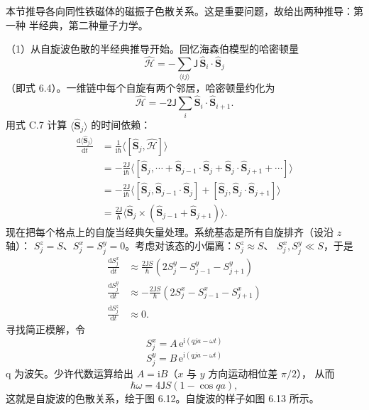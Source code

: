 本节推导各向同性铁磁体的磁振子色散关系。这是重要问题，故给出两种推导：第一种
半经典，第二种量子力学。

（1）从自旋波色散的半经典推导开始。回忆海森伯模型的哈密顿量
\begin{equation*}
\hat{\mathcal{H}} = -\sum_{\langle ij\rangle}\mathsf{J}\,\hat{\mathbf{S}}_i\cdot\hat{\mathbf{S}}_j\tag{6.9}
\end{equation*}
（即式 6.4）。一维链中每个自旋有两个邻居，哈密顿量约化为
\begin{equation*}
\hat{\mathcal{H}} = -2\mathsf{J}\sum_i\hat{\mathbf{S}}_i\cdot\hat{\mathbf{S}}_{i+1}.\tag{6.10}
\end{equation*}
用式 C.7 计算 $\langle\hat{\mathbf{S}}_j\rangle$ 的时间依赖：
\begin{align*}
\frac{\mathrm{d}\langle\hat{\mathbf{S}}_j\rangle}{\mathrm{d}t} &= \frac{1}{\mathrm{i}\hbar}\langle[\hat{\mathbf{S}}_j, \hat{\mathcal{H}}]\rangle\tag{6.11}\\
&= -\frac{2\mathsf{J}}{\mathrm{i}\hbar}\langle[\hat{\mathbf{S}}_j, \cdots+\hat{\mathbf{S}}_{j-1}\cdot\hat{\mathbf{S}}_j+\hat{\mathbf{S}}_j\cdot\hat{\mathbf{S}}_{j+1}+\cdots]\rangle\tag{6.12}\\
&= -\frac{2\mathsf{J}}{\mathrm{i}\hbar}\langle[\hat{\mathbf{S}}_j, \hat{\mathbf{S}}_{j-1}\cdot\hat{\mathbf{S}}_j]+[\hat{\mathbf{S}}_j, \hat{\mathbf{S}}_j\cdot\hat{\mathbf{S}}_{j+1}]\rangle\tag{6.13}\\
&= \frac{2\mathsf{J}}{\hbar}\langle\hat{\mathbf{S}}_j\times(\hat{\mathbf{S}}_{j-1}+\hat{\mathbf{S}}_{j+1})\rangle.\tag{6.14}
\end{align*}
现在把每个格点上的自旋当经典矢量处理。系统基态是所有自旋排齐（设沿 $z$ 轴）：
$S_j^{z}=S$、$S_j^{x}=S_j^{y}=0$。考虑对该态的小偏离：$S_j^{z}\approx S$、
$S_j^{x},S_j^{y}\ll S$，于是
\begin{align*}
\frac{\mathrm{d}S_j^{x}}{\mathrm{d}t} &\approx \frac{2\mathsf{J}S}{\hbar}(2S_j^{y}-S_{j-1}^{y}-S_{j+1}^{y})\tag{6.15}\\
\frac{\mathrm{d}S_j^{y}}{\mathrm{d}t} &\approx -\frac{2\mathsf{J}S}{\hbar}(2S_j^{x}-S_{j-1}^{x}-S_{j+1}^{x})\tag{6.16}\\
\frac{\mathrm{d}S_j^{z}}{\mathrm{d}t} &\approx 0.\tag{6.17}
\end{align*}
寻找简正模解，令
\begin{equation*}
S_j^{x} = A\,\mathrm{e}^{\mathrm{i}(qja-\omega t)}\tag{6.18}
\end{equation*}
\begin{equation*}
S_j^{y} = B\,\mathrm{e}^{\mathrm{i}(qja-\omega t)}\tag{6.19}
\end{equation*}
q 为波矢。少许代数运算给出 $A=\mathrm{i}B$（$x$ 与 $y$ 方向运动相位差 $\pi/2$），
从而
\begin{equation*}
\hbar\omega = 4\mathsf{J}S(1-\cos qa),\tag{6.20}
\end{equation*}
这就是自旋波的色散关系，绘于图 6.12。自旋波的样子如图 6.13 所示。

